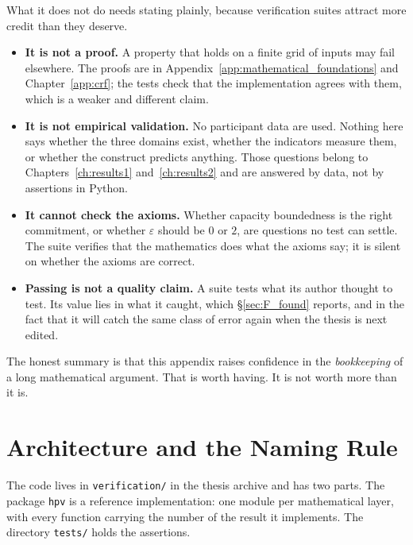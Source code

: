 What it does not do needs stating plainly, because verification suites attract
more credit than they deserve.

\begin{itemize}
\item \textbf{It is not a proof.} A property that holds on a finite grid of
inputs may fail elsewhere. The proofs are in
Appendix~\ref{app:mathematical_foundations} and Chapter~\ref{app:crf}; the tests check
that the implementation agrees with them, which is a weaker and different
claim.

\item \textbf{It is not empirical validation.} No participant data are used.
Nothing here says whether the three domains exist, whether the indicators
measure them, or whether the construct predicts anything. Those questions
belong to Chapters~\ref{ch:results1} and~\ref{ch:results2} and are answered by
data, not by assertions in Python.

\item \textbf{It cannot check the axioms.} Whether capacity boundedness is the
right commitment, or whether $\varepsilon$ should be $0$ or $2$, are questions
no test can settle. The suite verifies that the mathematics does what the
axioms say; it is silent on whether the axioms are correct.

\item \textbf{Passing is not a quality claim.} A suite tests what its author
thought to test. Its value lies in what it caught, which
\S\ref{sec:F_found} reports, and in the fact that it will catch the same class
of error again when the thesis is next edited.
\end{itemize}

The honest summary is that this appendix raises confidence in the
\emph{bookkeeping} of a long mathematical argument. That is worth having. It is
not worth more than it is.

\section{Architecture and the Naming Rule}
\label{sec:F_arch}

The code lives in \texttt{verification/} in the thesis archive and has two
parts. The package \texttt{hpv} is a reference implementation: one module per
mathematical layer, with every function carrying the number of the result it
implements. The directory \texttt{tests/} holds the assertions.

